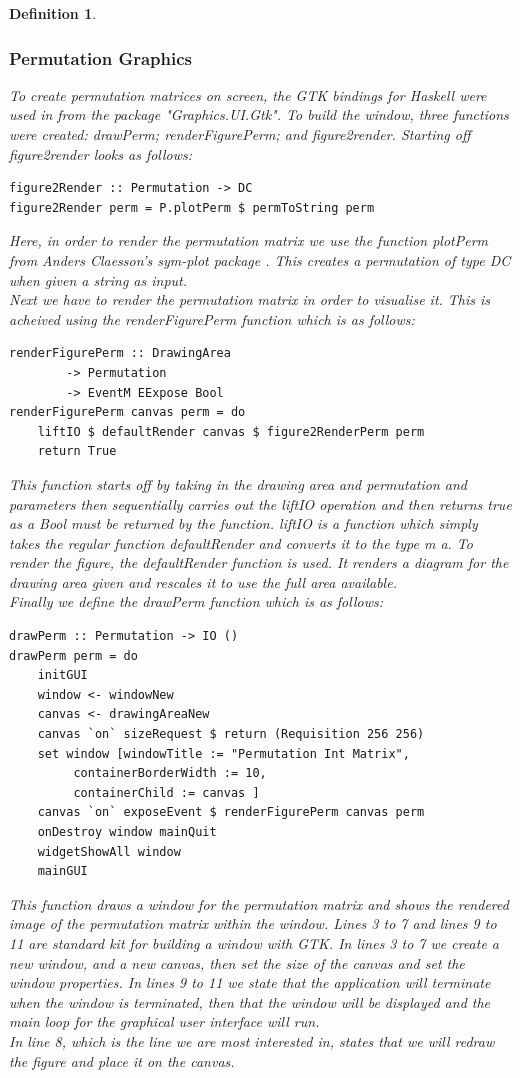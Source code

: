 \documentclass[12pt]{article}
\newtheorem{definition}{Definition}
\begin{document}
\begin{definition}
\subsubsection{Permutation Graphics}
To create permutation matrices on screen, the GTK bindings for Haskell were used in from the package "Graphics.UI.Gtk". To build the window, three functions were created: {\it drawPerm}; {\it renderFigurePerm}; and {\it figure2render}. Starting off {\it figure2render} looks as follows:
\begin{lstlisting}
figure2Render :: Permutation -> DC 
figure2Render perm = P.plotPerm $ permToString perm
\end{lstlisting}
Here, in order to render the permutation matrix we use the function {\it plotPerm} from Anders Claesson's sym-plot package \cite{ClaessonSymPlot}. This creates a permutation of type DC when given a string as input.\\
Next we have to render the permutation matrix in order to visualise it. This is acheived using the {\it renderFigurePerm} function which is as follows:
\begin{lstlisting}
renderFigurePerm :: DrawingArea 
		-> Permutation 
		-> EventM EExpose Bool
renderFigurePerm canvas perm = do
	liftIO $ defaultRender canvas $ figure2RenderPerm perm
	return True
\end{lstlisting}
This function starts off by taking in the drawing area and permutation and parameters then sequentially carries out the {\it liftIO} operation and then returns {\it true} as a {\it Bool} must be returned by the function. {\it liftIO} is a function which simply takes the regular function {\it defaultRender} and converts it to the type {\it m a}. To render the figure, the defaultRender function is used. It renders a diagram for the drawing area given and rescales it to use the full area available.\\
Finally we define the {\it drawPerm} function which is as follows:
\begin{lstlisting}
drawPerm :: Permutation -> IO ()
drawPerm perm = do
	initGUI
	window <- windowNew
	canvas <- drawingAreaNew
	canvas `on` sizeRequest $ return (Requisition 256 256)
	set window [windowTitle := "Permutation Int Matrix",
		 containerBorderWidth := 10,
		 containerChild := canvas ]
	canvas `on` exposeEvent $ renderFigurePerm canvas perm
	onDestroy window mainQuit
	widgetShowAll window
	mainGUI
\end{lstlisting}
This function draws a window for the permutation matrix and shows the rendered image of the permutation matrix within the window. Lines 3 to 7 and lines 9 to 11 are standard kit for building a window with GTK. In lines 3 to 7 we create a new window, and a new canvas, then set the size of the canvas and set the window properties. In lines 9 to 11 we state that the application will terminate when the window is terminated, then that the window will be displayed and the main loop for the graphical user interface will run.\\
In line 8, which is the line we are most interested in, states that we will redraw the figure and place it on the canvas.


\end{definition}
\end{document}
